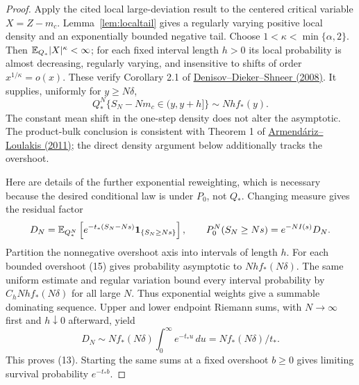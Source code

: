\begin{proof}
Apply the cited local large-deviation result to the centered critical variable
$X=Z-m_c$. Lemma~\ref{lem:localtail} gives a regularly varying positive
local density and an exponentially bounded negative tail. Choose
$1<\kappa<\min\{\alpha,2\}$. Then $\mathbb E_{Q_*}|X|^\kappa<\infty$;
for each fixed interval length $h>0$ its local probability is almost
decreasing, regularly varying, and insensitive to shifts of order
$x^{1/\kappa}=o(x)$. These verify Corollary 2.1 of
\href{https://arxiv.org/abs/math/0703265}{Denisov--Dieker--Shneer (2008)}.
It supplies, uniformly for $y\ge N\delta$,
\[
 Q_*^N\{S_N-Nm_c\in(y,y+h]\}
       \sim Nh f_*(y).
 \tag{15}
\]
The constant mean shift in the one-step density does not alter the
asymptotic. The product-bulk conclusion is consistent with Theorem 1 of
\href{https://arxiv.org/abs/0912.1516}{Armend\'ariz--Loulakis (2011)};
the direct density argument below additionally tracks the overshoot.

Here are details of the further exponential reweighting, which is
necessary because the desired conditional law is under $P_0$, not $Q_*$.
Changing measure gives the residual factor
\[
 D_N=\mathbb E_{Q_*^N}\left[e^{-t_*(S_N-Ns)}\mathbf1_{\{S_N\ge Ns\}}\right],
 \qquad P_0^N(S_N\ge Ns)=e^{-NI(s)}D_N.
\]
Partition the nonnegative overshoot axis into intervals of length $h$.
For each bounded overshoot (15) gives probability asymptotic to
$Nh f_*(N\delta)$. The same uniform estimate and regular variation
bound every interval probability by $C_hNh f_*(N\delta)$ for all
large $N$. Thus exponential weights give a summable dominating sequence.
Upper and lower endpoint Riemann sums, with $N\to\infty$ first and
$h\downarrow0$ afterward, yield
\[
 D_N\sim Nf_*(N\delta)\int_0^\infty e^{-t_*u}\,du
                 =Nf_*(N\delta)/t_*.
\]
This proves (13). Starting the same sums at a fixed overshoot $b\ge0$
gives limiting survival probability $e^{-t_*b}$.


\end{proof}

